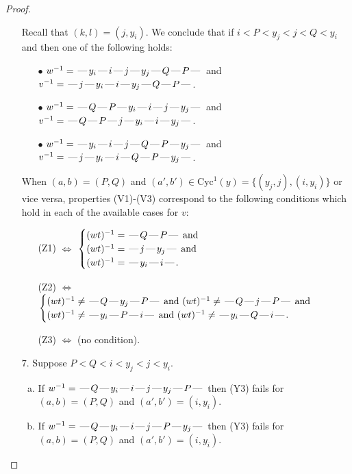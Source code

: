 \documentclass[10pt]{article}
\theoremstyle{definition}
\theoremstyle{definition}
\def\dash{\text{\hspace{0.5mm}---\hspace{0.5mm}}}
\def\Cyc{\mathrm{Cyc}}
\begin{document}
\begin{proof}
\begin{enumerate}
\begin{enumerate}[(a)]
\end{enumerate}
Recall that $(k,l) = (j,y_i)$.
We conclude that if $i < P < y_j < j < Q < y_i$ and then one of the following holds:
\begin{enumerate}
\item[$\bullet$] $w^{-1} = \dash y_i\dash i\dash j\dash y_j\dash Q\dash P\dash $ and $v^{-1} = \dash j\dash y_i\dash i\dash y_j\dash Q\dash P\dash $.
\item[$\bullet$] $w^{-1} = \dash Q\dash P\dash y_i\dash i\dash j\dash y_j\dash $ and $v^{-1} = \dash Q\dash P\dash j\dash y_i\dash i\dash y_j\dash $.
\item[$\bullet$] $w^{-1} = \dash y_i\dash i\dash j\dash Q\dash P\dash y_j\dash $ and $v^{-1} = \dash j\dash y_i\dash i\dash Q\dash P\dash y_j\dash $.
\end{enumerate}
When $(a,b)= (P,Q)$ and $(a',b')\in \Cyc^1(y)=\{(y_j,j),(i,y_i)\}$ or vice versa,
properties (V1)-(V3) correspond to the following conditions which hold in
each of the available cases for $v$:
\begin{enumerate}
\item[](Z1) $\Leftrightarrow$ $\begin{cases}\text{$(wt)^{-1} = \dash Q \dash P \dash$}\text{ and }\\
\text{$(wt)^{-1} = \dash j \dash y_j \dash$}\text{ and }\\
\text{$(wt)^{-1} = \dash y_i \dash i \dash$}.\end{cases}$
\item[](Z2) $\Leftrightarrow$ $\begin{cases}\text{$(wt)^{-1} \neq \dash Q \dash y_j \dash P \dash$ and $(wt)^{-1}\neq \dash Q \dash j \dash P \dash$}\text{ and }\\
\text{$(wt)^{-1} \neq \dash y_i \dash P \dash i \dash$ and $(wt)^{-1}\neq \dash y_i \dash Q \dash i \dash$}.\end{cases}$
\item[](Z3) $\Leftrightarrow$ (no condition).
\end{enumerate}
\item[$7$.] Suppose $P < Q < i < y_j < j < y_i$.
\begin{enumerate}[(a)]
\item If $w^{-1} = \dash Q\dash y_i\dash i\dash j\dash y_j\dash P\dash $ then (Y3) fails for $(a,b)=(P,Q)$ and $(a',b')=(i,y_i)$.
\item If $w^{-1} = \dash Q\dash y_i\dash i\dash j\dash P\dash y_j\dash $ then (Y3) fails for $(a,b)=(P,Q)$ and $(a',b')=(i,y_i)$.

\end{enumerate}
\end{enumerate}
\end{proof}
\end{document}
